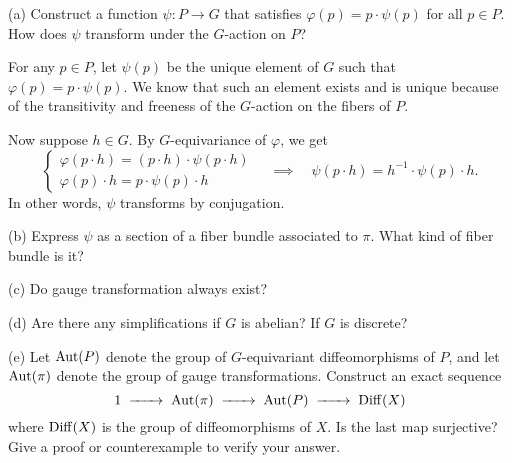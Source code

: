 \documentclass{../../templates/lkx_pset}
\begin{document}
\begin{parts}
  \begin{part}{(a)}
    Construct a function $\psi : P \to G$ that satisfies $\varphi(p) = p\cdot \psi(p)$ for all $p\in P$. How does $\psi$ transform under the $G$-action on $P$?
  \end{part}

  For any $p\in P$, let $\psi(p)$ be the unique element of $G$ such that $\varphi(p)=p\cdot \psi(p)$. We know that such an element exists and is unique because of the transitivity and freeness of the $G$-action on the fibers of $P$.

  Now suppose $h\in G$. By $G$-equivariance of $\varphi$, we get
  \[
    \begin{cases}
      \varphi (p\cdot h) = (p\cdot h)\cdot \psi(p\cdot h)\\
      \varphi(p)\cdot h = p\cdot \psi(p)\cdot h
    \end{cases}
    \quad\implies\quad \psi(p\cdot h) = h^{-1}\cdot \psi(p)\cdot h.
  \]
  In other words, $\psi$ transforms by conjugation.

  \begin{part}{(b)}
    Express $\psi$ as a section of a fiber bundle associated to $\pi$. What kind of fiber bundle is it?
  \end{part}

  \begin{part}{(c)}
    Do gauge transformation always exist?
  \end{part}

  \begin{part}{(d)}
    Are there any simplifications if $G$ is abelian? If $G$ is discrete?
  \end{part}

  \begin{part}{(e)}
    Let $\textrm{Aut}(P)$ denote the group of $G$-equivariant diffeomorphisms of $P$, and let $\textrm{Aut}(\pi)$ denote the group of gauge transformations. Construct an exact sequence
    \[
    1 \lkxto \Aut(\pi) \lkxto \Aut(P) \lkxto \Diff(X)
    \]
    where $\operatorname{Diff}(X)$ is the group of diffeomorphisms of $X$. Is the last map surjective? Give a proof or counterexample to verify your answer.
  \end{part}
\end{parts}
\end{document}
